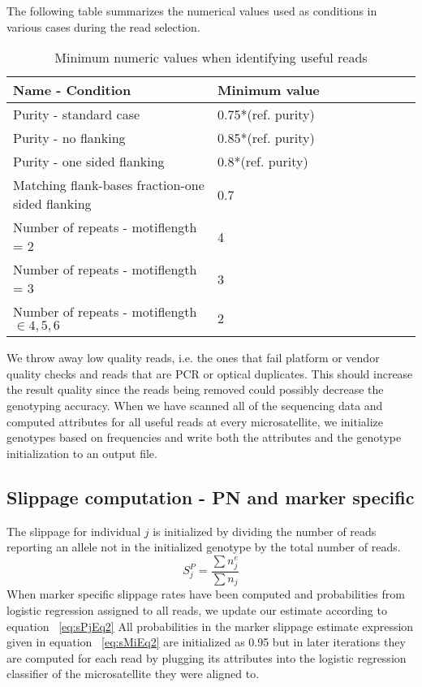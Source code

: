 \documentclass{bioinfo}
\begin{document}
    The following table summarizes the numerical values used as conditions in various cases during the read selection.
    \begin{center}
        \begin{table}[H]
            \caption{Minimum numeric values when identifying useful reads}
            \begin{tabular}{p{0.5\linewidth}|p{0.5\linewidth}}
                \hline
                \textbf{Name - Condition} & \textbf{Minimum value} \\ \hline
                Purity - standard case & 0.75*(ref. purity) \\ \hline
                Purity - no flanking & 0.85*(ref. purity) \\ \hline
                Purity - one sided flanking & 0.8*(ref. purity) \\ \hline
                Matching flank-bases fraction-one sided flanking & 0.7 \\ \hline
                Number of repeats - motiflength = 2 & 4 \\ \hline
                Number of repeats - motiflength = 3 & 3 \\ \hline
                Number of repeats - motiflength $\in {4,5,6}$ &  2\\ 
                \hline
            \end{tabular}
            \label{table:numConditions}
        \end{table}
    \end{center}
    
    We throw away low quality reads, i.e. the ones that fail platform or vendor quality checks and reads that are PCR or optical duplicates. This should increase the result quality since the reads being removed could possibly decrease the genotyping accuracy.
    When we have scanned all of the sequencing data and computed attributes for all useful reads at every microsatellite, we initialize genotypes based on frequencies and write both the attributes and the genotype initialization to an output file.
\subsection{Slippage computation - PN and marker specific}
    The slippage for individual $j$ is initialized by dividing the number of reads reporting an allele not in the initialized genotype by the total number of reads.
    \begin{equation}
            S^{P}_j = \frac{\sum n^e_j}{\sum n_j}
    \end{equation}
    When marker specific slippage rates have been computed and probabilities from logistic regression assigned to all reads, we update our estimate according to equation ~\ref{eq:sPjEq2}
    All probabilities in the marker slippage estimate expression given in equation ~\ref{eq:sMiEq2} are initialized as 0.95 but in later iterations they are computed for each read by plugging its attributes into the logistic regression classifier of the microsatellite they were aligned to.
\end{document}
